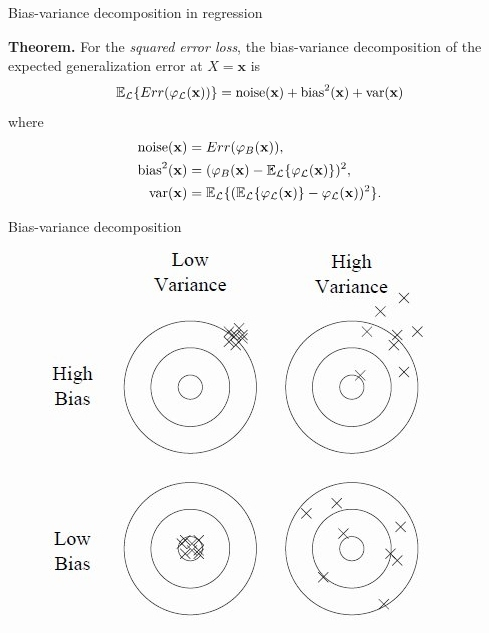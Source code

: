 \documentclass{beamer}
\begin{document}
\begin{frame}{Bias-variance decomposition in regression}

{\bf Theorem.} For the {\it squared error loss}, the bias-variance decomposition of the expected
generalization error at $X=\mathbf{x}$ is
\begin{equation*}
\mathbb{E}_{\cal L} \{ Err(\varphi_{\cal L}(\mathbf{x})) \} = \text{noise}(\mathbf{x}) + \text{bias}^2(\mathbf{x}) + \text{var}(\mathbf{x})
\end{equation*}
where
\begin{align*}
\text{noise}(\mathbf{x}) &= Err(\varphi_B(\mathbf{x})), \\
\text{bias}^2(\mathbf{x}) &= (\varphi_B(\mathbf{x}) - \mathbb{E}_{\cal L} \{ \varphi_{\cal L}(\mathbf{x}) \} )^2, \\
\text{var}(\mathbf{x}) &= \mathbb{E}_{\cal L} \{ (\mathbb{E}_{\cal L} \{ \varphi_{\cal L}(\mathbf{x}) \} - \varphi_{\cal L}(\mathbf{x}))^2 \}.
\end{align*}

\end{frame}

\begin{frame}{Bias-variance decomposition}
\begin{figure}
\includegraphics[scale=0.7]{./figures/bias-variance-darts.jpg}
\end{figure}
\end{frame}
\end{document}
